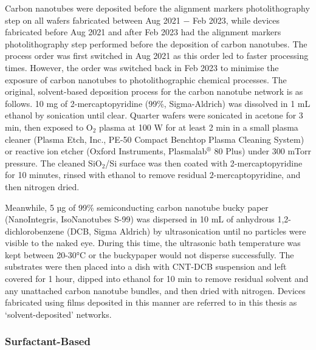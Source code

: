 \documentclass[
  a4paper,
]{scrbook}
\begin{document}
Carbon nanotubes were deposited before the alignment markers
photolithography step on all wafers fabricated between Aug 2021 \(-\)
Feb 2023, while devices fabricated before Aug 2021 and after Feb 2023
had the alignment markers photolithography step performed before the
deposition of carbon nanotubes. The process order was first switched in
Aug 2021 as this order led to faster processing times. However, the
order was switched back in Feb 2023 to minimise the exposure of carbon
nanotubes to photolithographic chemical processes. The original,
solvent-based deposition process for the carbon nanotube network is as
follows. 10 mg of 2-mercaptopyridine (99\%, Sigma-Aldrich) was dissolved
in 1 mL ethanol by sonication until clear. Quarter wafers were sonicated
in acetone for 3 min, then exposed to O\(_2\) plasma at 100 W for at
least 2 min in a small plasma cleaner (Plasma Etch, Inc., PE-50 Compact
Benchtop Plasma Cleaning System) or reactive ion etcher (Oxford
Instruments, Plasmalab\(^\circledR\) 80 Plus) under 300 mTorr pressure.
The cleaned SiO\(_2\)/Si surface was then coated with 2-mercaptopyridine
for 10 minutes, rinsed with ethanol to remove residual
\(2\)-mercaptopyridine, and then nitrogen dried.

Meanwhile, 5 µg of 99\% semiconducting carbon nanotube bucky paper
(NanoIntegris, IsoNanotubes S-99) was dispersed in 10 mL of anhydrous
1,2-dichlorobenzene (DCB, Sigma Aldrich) by ultrasonication until no
particles were visible to the naked eye. During this time, the
ultrasonic bath temperature was kept between 20-30°C or the buckypaper
would not disperse successfully. The substrates were then placed into a
dish with CNT-DCB suspension and left covered for 1 hour, dipped into
ethanol for 10 min to remove residual solvent and any unattached carbon
nanotube bundles, and then dried with nitrogen. Devices fabricated using
films deposited in this manner are referred to in this thesis as
`solvent-deposited' networks.

\hypertarget{surfactant-based}{%
\subsubsection*{Surfactant-Based}\label{surfactant-based}}
\end{document}
